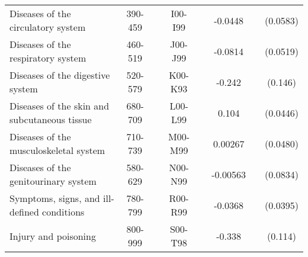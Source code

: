 \documentclass{scrartcl} %
\begin{document}
\begin{table}[htbp]
\begin{threeparttable}
{\begin{tabular}{l*{7}{c}}
 \hspace{4pt} Diseases of the circulatory system                          	&	390-459		& &		I00-I99 & & -0.0448				& & (0.0583)	\\
 \hspace{4pt} Diseases of the respiratory system                          	&	460-519		& &		J00-J99 & & -0.0814				& & (0.0519)	\\
 \hspace{4pt} Diseases of the digestive system                            	&	520-579		& &		K00-K93 & & -0.242				& & (0.146)		\\
 \hspace{4pt} Diseases of the skin and subcutaneous tissue                	&	680-709		& &		L00-L99 & & 0.104\sym{**} 		& & (0.0446)	\\
 \hspace{4pt} Diseases of the musculoskeletal system						&	710-739		& &		M00-M99 & & 0.00267 			& & (0.0480)	\\
 \hspace{4pt} Diseases of the genitourinary system                        	&	580-629		& &		N00-N99 & & -0.00563 			& & (0.0834)	\\
 \hspace{4pt} Symptoms, signs, and ill-defined conditions                 	&	780-799		& &		R00-R99 & & -0.0368 			& & (0.0395)	\\
 \hspace{4pt} Injury and poisoning                                        	&	800-999		& &		S00-T98 & & -0.338\sym{***} 	& & (0.114)		\\

\bottomrule
\end{tabular}}
\end{threeparttable} \end{table}
\end{document}
